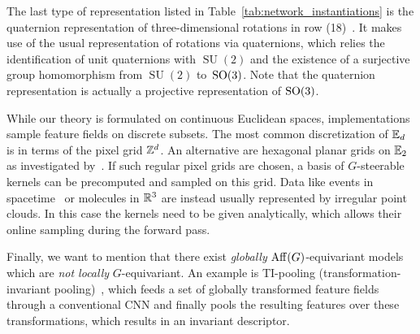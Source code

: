 The last type of representation listed in Table~\ref{tab:network_instantiations} is the quaternion representation of three-dimensional rotations in row (18)~\cite{zhang2019quaternion}.
It makes use of the usual representation of rotations via quaternions, which relies the identification of unit quaternions with $\operatorname{SU}(2)$ and the existence of a surjective group homomorphism from $\operatorname{SU}(2)$ to~$\operatorname{SO}(3)$.
Note that the quaternion representation is actually a projective representation of $\operatorname{SO}(3)$.


While our theory is formulated on continuous Euclidean spaces, implementations sample feature fields on discrete subsets.
The most common discretization of $\mathbb{E}_d$ is in terms of the pixel grid $\mathbb{Z}^d$.
An alternative are hexagonal planar grids on $\mathbb{E}_2$ as investigated by~\citet{Hoogeboom2018-HEX}.
If such regular pixel grids are chosen, a basis of $G$-steerable kernels can be precomputed and sampled on this grid.
Data like events in spacetime~\cite{shutty2020learning} or molecules in $\mathbb{R}^3$ \cite{Thomas2018-TFN,Kondor2018-NBN,anderson2019cormorant,miller2020relevance} are instead usually represented by irregular point clouds.
In this case the kernels need to be given analytically, which allows their online sampling during the forward pass.


Finally, we want to mention that there exist \emph{globally} $\operatorname{Aff}(G)$-equivariant models which are \emph{not locally} $G$-equivariant.
An example is TI-pooling (transformation-invariant pooling)~\cite{Laptev_2016_CVPR}, which feeds a set of globally transformed feature fields through a conventional CNN and finally pools the resulting features over these transformations, which results in an invariant descriptor.
